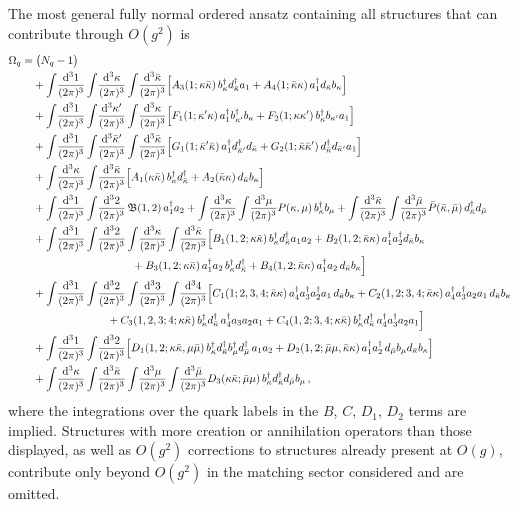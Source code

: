 \documentclass[11pt]{article}
\newcommand{\dd}{\mathrm{d}}
\newcommand{\ip}[1]{\int\!\frac{\dd^3 #1}{(2\pi)^3}}
\newcommand{\dg}{\dagger}
\newcommand{\OM}{\Omega}
\newcommand{\OMq}{\OM_{q}}
\begin{document}
The most general fully normal ordered ansatz containing all structures that can contribute through
$O(g^2)$ is
\begin{align}
\OMq=&\;\big(N_q-1\big)
\nonumber\\
&+\ip{1}\ip{\kappa}\ip{\bar\kappa}
\Big[A_3(1;\kappa\bar\kappa)\,b^\dg_\kappa d^\dg_{\bar\kappa}a_1
+A_4(1;\bar\kappa\kappa)\,a^\dg_1 d_{\bar\kappa}b_\kappa\Big]
\nonumber\\
&+\ip{1}\ip{\kappa'}\ip{\kappa}
\Big[F_1(1;\kappa'\kappa)\,a^\dg_1 b^\dg_{\kappa'}b_\kappa
+F_2(1;\kappa\kappa')\,b^\dg_{\kappa}b_{\kappa'}a_1\Big]
\nonumber\\
&+\ip{1}\ip{\bar\kappa'}\ip{\bar\kappa}
\Big[G_1(1;\bar\kappa'\bar\kappa)\,a^\dg_1 d^\dg_{\bar\kappa'}d_{\bar\kappa}
+G_2(1;\bar\kappa\bar\kappa')\,d^\dg_{\bar\kappa}d_{\bar\kappa'}a_1\Big]
\nonumber\\
&+\ip{\kappa}\ip{\bar\kappa}
\Big[A_1(\kappa\bar\kappa)\,b^\dg_\kappa d^\dg_{\bar\kappa}
+A_2(\bar\kappa\kappa)\,d_{\bar\kappa}b_\kappa\Big]
\nonumber\\
&+\ip{1}\ip{2}\,\mathfrak{B}(1,2)\,a^\dg_1a_2
+\ip{\kappa}\ip{\mu}P(\kappa,\mu)\,b^\dg_\kappa b_\mu
+\ip{\bar\kappa}\ip{\bar\mu}\bar P(\bar\kappa,\bar\mu)\,d^\dg_{\bar\kappa}d_{\bar\mu}
\nonumber\\
&+\ip{1}\ip{2}\ip{\kappa}\ip{\bar\kappa}
\Big[B_1(1,2;\kappa\bar\kappa)\,b^\dg_\kappa d^\dg_{\bar\kappa}a_1a_2
+B_2(1,2;\bar\kappa\kappa)\,a^\dg_1a^\dg_2 d_{\bar\kappa}b_\kappa
\nonumber\\
&\hspace{3.2cm}
+B_3(1,2;\kappa\bar\kappa)\,a^\dg_1a_2\,b^\dg_\kappa d^\dg_{\bar\kappa}
+B_4(1,2;\bar\kappa\kappa)\,a^\dg_1a_2\,d_{\bar\kappa}b_\kappa\Big]
\nonumber\\
&+\ip{1}\ip{2}\ip{3}\ip{4}
\Big[C_1(1;2,3,4;\bar\kappa\kappa)\,a^\dg_4a^\dg_3a^\dg_2a_1\,d_{\bar\kappa}b_\kappa
+C_2(1,2;3,4;\bar\kappa\kappa)\,a^\dg_4a^\dg_3a_2a_1\,d_{\bar\kappa}b_\kappa
\nonumber\\
&\hspace{2.4cm}
+C_3(1,2,3;4;\kappa\bar\kappa)\,b^\dg_\kappa d^\dg_{\bar\kappa}\,a^\dg_4a_3a_2a_1
+C_4(1,2;3,4;\kappa\bar\kappa)\,b^\dg_\kappa d^\dg_{\bar\kappa}\,a^\dg_4a^\dg_3a_2a_1\Big]
\nonumber\\
&+\ip{1}\ip{2}
\Big[D_1(1,2;\kappa\bar\kappa,\mu\bar\mu)\,
b^\dg_\kappa d^\dg_{\bar\kappa}b^\dg_\mu d^\dg_{\bar\mu}\,a_1a_2
+D_2(1,2;\bar\mu\mu,\bar\kappa\kappa)\,a^\dg_1a^\dg_2\,d_{\bar\mu}b_\mu d_{\bar\kappa}b_\kappa\Big]
\nonumber\\
&+\ip{\kappa}\ip{\bar\kappa}\ip{\mu}\ip{\bar\mu}
D_3(\kappa\bar\kappa;\bar\mu\mu)\,b^\dg_\kappa d^\dg_{\bar\kappa}d_{\bar\mu}b_\mu\,,
\label{eq:ansatz}
\end{align}
where the integrations over the quark labels in the $B$, $C$, $D_1$, $D_2$ terms are implied.
Structures with more creation or annihilation operators than those displayed, as well as
$O(g^2)$ corrections to structures already present at $O(g)$, contribute only beyond $O(g^2)$ in
the matching sector considered and are omitted.
\end{document}
